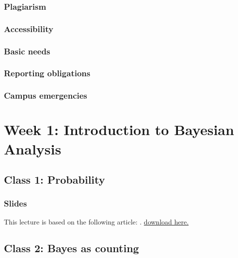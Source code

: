 \documentclass[
]{book}
\begin{document}
\subsection{Plagiarism}\label{plagiarism}

\subsection{Accessibility}\label{accessibility}

\subsection{Basic needs}\label{basic-needs}

\subsection{Reporting obligations}\label{reporting-obligations}

\subsection{Campus emergencies}\label{campus-emergencies}

\chapter{Week 1: Introduction to Bayesian Analysis}\label{week-1-introduction-to-bayesian-analysis}

\section{Class 1: Probability}\label{class-1-probability}

\subsection{Slides}\label{slides}

This lecture is based on the following article: \citet{etz_introduction_2018-1}. \href{readings/Etz\%20and\%20Vandekerckhove\%20-\%202018\%20-\%20Introduction\%20to\%20Bayesian\%20Inference\%20for\%20Psychology.pdf}{download here.}

\section{Class 2: Bayes as counting}\label{class-2-bayes-as-counting}
\end{document}
